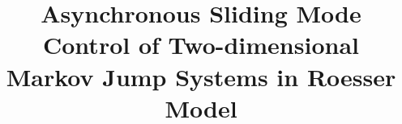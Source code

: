 \documentclass[conference]{IEEEtran}
\begin{document}
%
\title{Asynchronous Sliding Mode Control of Two-dimensional Markov Jump Systems in Roesser Model}




% 
\end{document}
